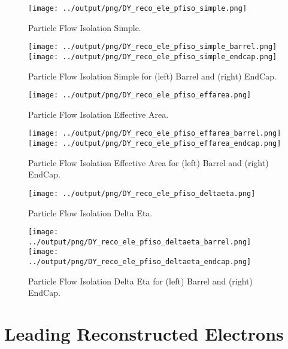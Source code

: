\documentclass[11pt]{book}
\begin{document}
\begin{figure}[ht]
\centering
\texttt{[image: ../output/png/DY\_reco\_ele\_pfiso\_simple.png]}
\caption{Particle Flow Isolation Simple.}
\label{fig:dy_reco_ele_pfiso_simple}
\end{figure}

\begin{figure}[ht]
\centering
\texttt{[image: ../output/png/DY\_reco\_ele\_pfiso\_simple\_barrel.png]}
\texttt{[image: ../output/png/DY\_reco\_ele\_pfiso\_simple\_endcap.png]}
\caption{Particle Flow Isolation Simple for (left) Barrel and (right) EndCap.}
\label{fig:dy_reco_ele_pfiso_simple_regions}
\end{figure}


\begin{figure}[ht]
\centering
\texttt{[image: ../output/png/DY\_reco\_ele\_pfiso\_effarea.png]}
\caption{Particle Flow Isolation Effective Area.}
\label{fig:dy_reco_ele_pfiso_effarea}
\end{figure}

\begin{figure}[ht]
\centering
\texttt{[image: ../output/png/DY\_reco\_ele\_pfiso\_effarea\_barrel.png]}
\texttt{[image: ../output/png/DY\_reco\_ele\_pfiso\_effarea\_endcap.png]}
\caption{Particle Flow Isolation Effective Area for (left) Barrel and (right) EndCap.}
\label{fig:dy_reco_ele_pfiso_effarea_regions}
\end{figure}


\begin{figure}[ht]
\centering
\texttt{[image: ../output/png/DY\_reco\_ele\_pfiso\_deltaeta.png]}
\caption{Particle Flow Isolation Delta Eta.}
\label{fig:dy_reco_ele_pfiso_deltaeta}
\end{figure}

\begin{figure}[ht]
\centering
\texttt{[image: ../output/png/DY\_reco\_ele\_pfiso\_deltaeta\_barrel.png]}
\texttt{[image: ../output/png/DY\_reco\_ele\_pfiso\_deltaeta\_endcap.png]}
\caption{Particle Flow Isolation Delta Eta for (left) Barrel and (right) EndCap.}
\label{fig:dy_reco_ele_pfiso_deltaeta_regions}
\end{figure}


\clearpage


\section{Leading Reconstructed Electrons}
\end{document}
